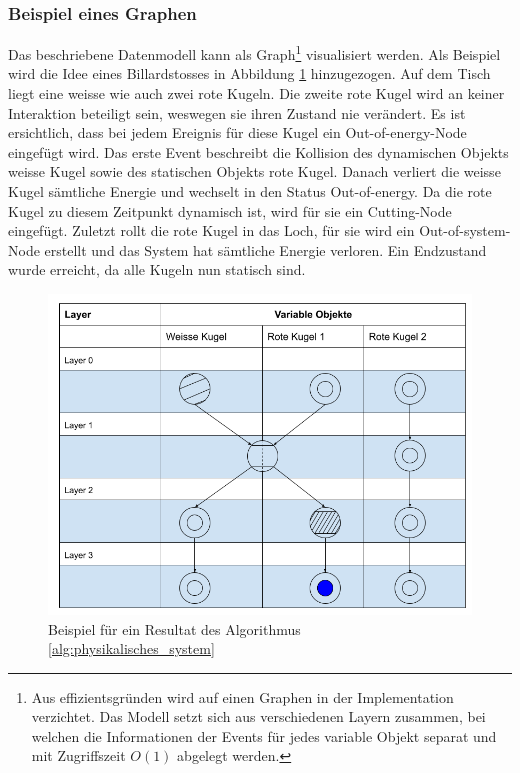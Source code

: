 \subsubsection{Beispiel eines Graphen}
Das beschriebene Datenmodell kann als Graph\footnote{Aus effizientsgründen wird auf einen Graphen in der Implementation
verzichtet. Das Modell setzt sich aus verschiedenen Layern zusammen, bei welchen die Informationen der Events für jedes
variable Objekt separat und mit Zugriffszeit $O(1)$ abgelegt werden.} visualisiert werden. Als Beispiel wird die Idee
eines Billardstosses in Abbildung \ref{fig:Beispiel für ein Resultat des Algorithmus phys_sys} hinzugezogen.
Auf dem Tisch liegt eine weisse wie auch zwei rote Kugeln. Die zweite rote Kugel wird an keiner Interaktion beteiligt sein,
weswegen sie ihren Zustand nie verändert. Es ist ersichtlich, dass bei jedem Ereignis für diese Kugel ein \glqq Out-of-energy-Node\grqq{}
eingefügt wird.
Das erste Event beschreibt die Kollision des dynamischen Objekts \glqq weisse Kugel\grqq{} sowie des
statischen Objekts \glqq rote Kugel\grqq{}. Danach verliert die weisse Kugel sämtliche Energie und wechselt in den
Status \glqq Out-of-energy\grqq{}. Da die rote Kugel zu diesem Zeitpunkt dynamisch ist, wird für sie ein
\glqq Cutting-Node\grqq{} eingefügt. Zuletzt rollt die rote Kugel in das Loch, für sie wird ein \glqq Out-of-system-Node\grqq{}
erstellt und das System hat sämtliche Energie verloren. Ein Endzustand wurde erreicht, da alle Kugeln nun statisch sind.

\begin{figure}[h!]
    \begin{center}
        \includegraphics[width=0.6\linewidth]{../common/03_billiard_ai/resources/10_datenmodell_beispiel.png}
    \end{center}
    \caption{Beispiel für ein Resultat des Algorithmus \ref{alg:physikalisches_system}}
    \label{fig:Beispiel für ein Resultat des Algorithmus phys_sys}
\end{figure}

